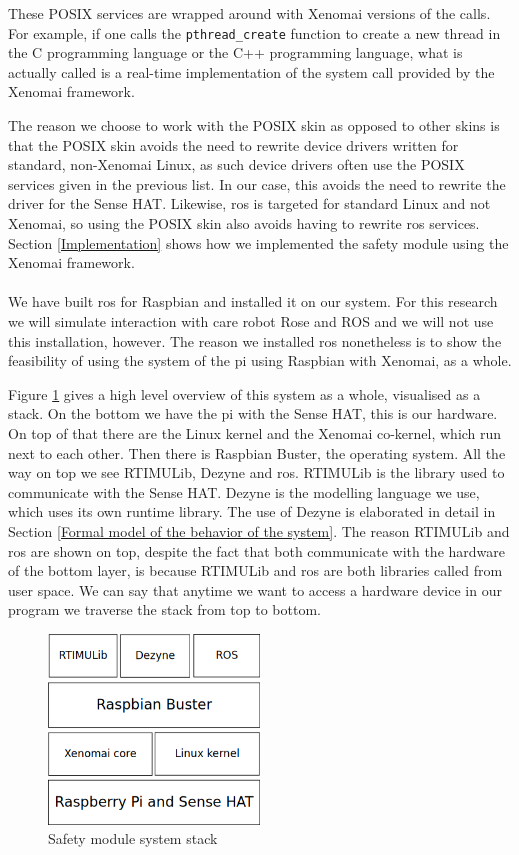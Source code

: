 \documentclass[12pt]{scrreprt}
\begin{document}
These POSIX services are wrapped around with Xenomai versions of the calls. For example, if one calls the \texttt{pthread_create} function to create a new thread in the C programming language or the C++ programming language, what is actually called is a real-time implementation of the system call provided by the Xenomai framework.
\par
The reason we choose to work with the POSIX skin as opposed to other skins is that the POSIX skin avoids the need to rewrite device drivers written for standard, non-Xenomai Linux, as such device drivers often use the POSIX services given in the previous list. In our case, this avoids the need to rewrite the driver for the Sense HAT. Likewise, \acrshort{ros} is targeted for standard Linux and not Xenomai, so using the POSIX skin also avoids having to rewrite \acrshort{ros} services. Section \ref{Implementation} shows how we implemented the safety module using the Xenomai framework.
\\\\
We have built \acrshort{ros} for Raspbian and installed it on our system. For this research we will simulate interaction with care robot Rose and ROS and we will not use this installation, however. The reason we installed \acrshort{ros} nonetheless is to show the feasibility of using the system of the \gls{pi} using Raspbian with Xenomai, as a whole.
\par
Figure \ref{fig:stack} gives a high level overview of this system as a whole, visualised as a stack. On the bottom we have the \gls{pi} with the Sense HAT, this is our hardware. On top of that there are the Linux kernel and the Xenomai co-kernel, which run next to each other. Then there is Raspbian Buster, the operating system. All the way on top we see RTIMULib, Dezyne and \acrshort{ros}. RTIMULib is the library used to communicate with the Sense HAT. Dezyne is the modelling language we use, which uses its own runtime library. The use of Dezyne is elaborated in detail in Section \ref{Formal model of the behavior of the system}. The reason RTIMULib and \acrshort{ros} are shown on top, despite the fact that both communicate with the hardware of the bottom layer, is because RTIMULib and \acrshort{ros} are both libraries called from user space. We can say that anytime we want to access a hardware device in our program we traverse the stack from top to bottom.

\begin{figure}[H]
    \centering
    \includegraphics[width=0.5\textwidth]{Figures/results/os_environment_stack.png}
    \caption{Safety module system stack}
    \label{fig:stack}
\end{figure}
\end{document}
